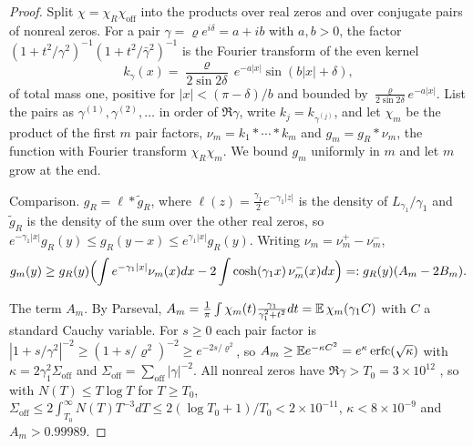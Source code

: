 \begin{proof}
Split $\chi=\chi_R\chi_{\mathrm{off}}$ into the products over real zeros and over conjugate pairs of nonreal zeros. For a pair $\gamma=\varrho e^{i\delta}=a+ib$ with $a,b>0$, the factor $(1+t^2/\gamma^2)^{-1}(1+t^2/\bar\gamma^2)^{-1}$ is the Fourier transform of the even kernel
\[
k_\gamma(x)=\frac{\varrho}{2\sin2\delta}\,e^{-a|x|}\sin(b|x|+\delta),
\]
of total mass one, positive for $|x|<(\pi-\delta)/b$ and bounded by $\frac{\varrho}{2\sin2\delta}e^{-a|x|}$. List the pairs as $\gamma^{(1)},\gamma^{(2)},\ldots$ in order of $\Re\gamma$, write $k_j=k_{\gamma^{(j)}}$, and let $\chi_m$ be the product of the first $m$ pair factors, $\nu_m=k_1*\cdots*k_m$ and $g_m=g_R*\nu_m$, the function with Fourier transform $\chi_R\chi_m$. We bound $g_m$ uniformly in $m$ and let $m$ grow at the end.

Comparison. $g_R=\ell*\tilde g_R$, where $\ell(z)=\frac{\gamma_1}2e^{-\gamma_1|z|}$ is the density of $L_{\gamma_1}/\gamma_1$ and $\tilde g_R$ is the density of the sum over the other real zeros, so $e^{-\gamma_1|x|}g_R(y)\le g_R(y-x)\le e^{\gamma_1|x|}g_R(y)$. Writing $\nu_m=\nu_m^+-\nu_m^-$,
\[
g_m(y)\ge g_R(y)\Bigl(\int e^{-\gamma_1|x|}\nu_m(x)dx-2\int\cosh(\gamma_1x)\,\nu_m^-(x)dx\Bigr)=:g_R(y)(A_m-2B_m).
\]

The term $A_m$. By Parseval, $A_m=\frac1\pi\int\chi_m(t)\frac{\gamma_1}{\gamma_1^2+t^2}dt=\mathbb{E}\,\chi_m(\gamma_1C)$ with $C$ a standard Cauchy variable. For $s\ge0$ each pair factor is $|1+s/\gamma^2|^{-2}\ge(1+s/\varrho^2)^{-2}\ge e^{-2s/\varrho^2}$, so $A_m\ge\mathbb{E} e^{-\kappa C^2}=e^\kappa\operatorname{erfc}(\sqrt\kappa)$ with $\kappa=2\gamma_1^2\Sigma_{\mathrm{off}}$ and $\Sigma_{\mathrm{off}}=\sum_{\mathrm{off}}|\gamma|^{-2}$. All nonreal zeros have $\Re\gamma>T_0=3\times10^{12}$ \cite{PT21}, so with $N(T)\le T\log T$ for $T\ge T_0$, $\Sigma_{\mathrm{off}}\le2\int_{T_0}^\infty N(T)T^{-3}dT\le2(\log T_0+1)/T_0<2\times10^{-11}$, $\kappa<8\times10^{-9}$ and $A_m>0.99989$.


\end{proof}
